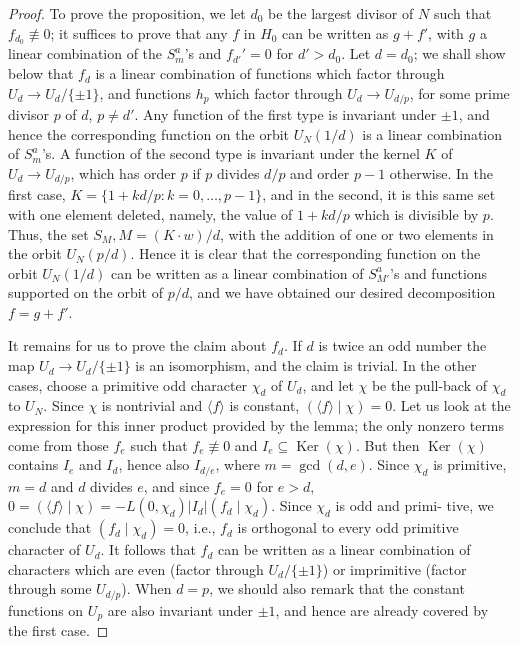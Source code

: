 \documentclass[12pt,a4paper]{article}
\theoremstyle{plain}
\theoremstyle{definition}
\theoremstyle{remark}
\DeclareMathOperator{\Ker}{Ker}
\begin{document}
\begin{proof}
To prove the proposition, we let $d_0$ be the largest divisor of $N$ such that
$f_{d_0} \not\equiv 0$; it suffices to prove that any $f$ in $H_0$ can be written as $g + f'$,
with $g$ a linear combination of the $S_m^a$'s and $f_{d'}' = 0$ for $d' > d_0$. Let
$d = d_0$; we shall show below that $f_d$ is a linear combination of functions which
factor through $U_d \to U_d/\{\pm 1\}$, and functions $h_p$ which factor through
$U_d \to U_{d/p}$, for some prime divisor $p$ of $d$, $p \neq d'$. Any function
of the first type is invariant under $\pm 1$, and hence the corresponding function on
the orbit $U_N(1/d)$ is a linear combination of $S_m^a$'s. A function of the second
type is invariant under the kernel $K$ of $U_d \to U_{d/p}$, which has order $p$ if
$p$ divides $d/p$ and order $p-1$ otherwise. In the first case,
$K = \{1 + kd/p: k = 0, \ldots, p-1\}$, and in
the second, it is this same set with one element deleted, namely, the value of
$1 + kd/p$ which is divisible by $p$. Thus, the set $S_{M}, M = (K \cdot w)/d$, with the
addition of one or two elements in the orbit $U_N(p/d)$. Hence it is clear that the
corresponding function on the orbit $U_N(1/d)$ can be written as a linear
combination of $S_{M'}^a$'s and functions supported on the orbit of $p/d$, and we
have obtained our desired decomposition $f = g + f'$.

It remains for us to prove the claim about $f_d$. If $d$ is twice an odd number the map
$U_d \to U_d/\{\pm 1\}$ is an isomorphism, and the claim is trivial. In the other
cases, choose a primitive odd character $\chi_d$ of $U_d$, and let $\chi$ be the pull-back
of $\chi_d$ to $U_N$. Since $\chi$ is nontrivial and $\langle f \rangle$ is constant, $(\langle f \rangle \mid \chi) = 0$.
Let us look at the expression for this inner product provided by the lemma; the
only nonzero terms come from those $f_e$ such that $f_e \not\equiv 0$ and $I_e \subseteq \Ker(\chi)$.
But then $\Ker(\chi)$ contains $I_e$ and $I_d$, hence also $I_{d/e}$, where $m = \gcd(d,e)$.
Since $\chi_d$ is primitive, $m = d$ and $d$ divides $e$, and since $f_e = 0$ for $e > d$,
$0 = (\langle f \rangle \mid \chi) = -L(0, \chi_d) |I_d| (f_d \mid \chi_d)$. Since $\chi_d$ is odd and primi-
tive, we conclude that $(f_d \mid \chi_d) = 0$, i.e., $f_d$ is orthogonal to every odd primitive
character of $U_d$. It follows that $f_d$ can be written as a linear combination of
characters which are even (factor through $U_d/\{\pm 1\}$) or imprimitive (factor
through some $U_{d/p}$). When $d = p$, we should also remark that the constant
functions on $U_p$ are also invariant under $\pm 1$, and hence are already covered
by the first case.
\end{proof}
\end{document}
